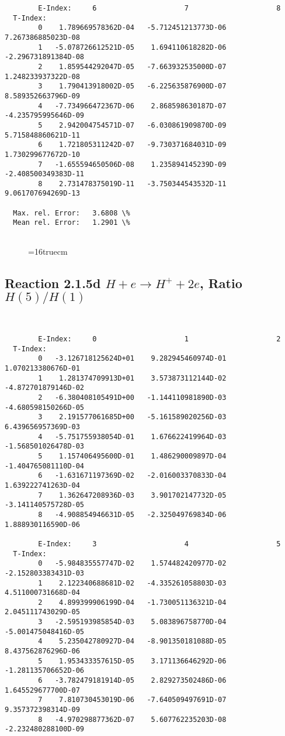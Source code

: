 \documentclass[12pt,dvipdfmx]{article}
\begin{document}
{\begin{small}
\begin{verbatim}
        E-Index:     6                     7                     8
  T-Index:
        0    1.789669578362D-04   -5.712451213773D-06    7.267386885023D-08
        1   -5.078726612521D-05    1.694110618282D-06   -2.296731891384D-08
        2    1.859544292047D-05   -7.663932535000D-07    1.248233937322D-08
        3    1.790413918002D-05   -6.225635876900D-07    8.589352663796D-09
        4   -7.734966472367D-06    2.868598630187D-07   -4.235795995646D-09
        5    2.942004754571D-07   -6.030861909870D-09    5.715848860621D-11
        6    1.721805311242D-07   -9.730371684031D-09    1.730299677672D-10
        7   -1.655594650506D-08    1.235894145239D-09   -2.408500349383D-11
        8    2.731478375019D-11   -3.750344543532D-11    9.061707694269D-13

  Max. rel. Error:   3.6808 \%
  Mean rel. Error:   1.2901 \%


\end{verbatim}\end{small}
\begin{figure} \label{2.1.5c}
\epsfxsize=16truecm
\end{figure}

\newpage
\subsection{
Reaction 2.1.5d  $H + e \rightarrow H^+ + 2e$, Ratio $H(5)/H(1)$
}


\begin{small}\begin{verbatim}


        E-Index:     0                     1                     2
  T-Index:
        0   -3.126718125624D+01    9.282945460974D-01    1.070213380676D-01
        1    1.281374709913D+01    3.573873112144D-02   -4.872701879146D-02
        2   -6.380408105491D+00   -1.144110981890D-03   -4.680598150266D-05
        3    2.191577061685D+00   -5.161589020256D-03    6.439656957369D-03
        4   -5.751755938054D-01    1.676622419964D-03   -1.568501026478D-03
        5    1.157406495600D-01    1.486290009897D-04   -1.404765081110D-04
        6   -1.631671197369D-02   -2.016003370833D-04    1.639222741263D-04
        7    1.362647208936D-03    3.901702147732D-05   -3.141140575728D-05
        8   -4.908854946631D-05   -2.325049769834D-06    1.888930116590D-06

        E-Index:     3                     4                     5
  T-Index:
        0   -5.984835557747D-02    1.574482420977D-02   -2.152803383431D-03
        1    2.122340688681D-02   -4.335261058803D-03    4.511000731668D-04
        2    4.899399906199D-04   -1.730051136321D-04    2.045111743029D-05
        3   -2.595193985854D-03    5.083896758770D-04   -5.001475048416D-05
        4    5.235042780927D-04   -8.901350181088D-05    8.437562876296D-06
        5    1.953433357615D-05    3.171136646292D-06   -1.281135706652D-06
        6   -3.782479181914D-05    2.829273502486D-06    1.645529677700D-07
        7    7.810730453019D-06   -7.640509497691D-07    9.357372398314D-09
        8   -4.970298877362D-07    5.607762235203D-08   -2.232480288100D-09


\end{verbatim}
\end{small}}
\end{document}
